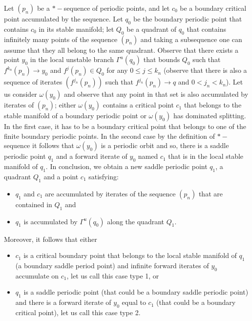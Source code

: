 \documentclass[a4paper,11pt]{article}
\theoremstyle{definition}
\def\Ga{\Gamma}
\def\Ga{\Gamma}
\begin{document}
Let $(p_n)$ be a $*-$sequence of periodic points, and let $c_0$ be a boundary critical point accumulated by the sequence. Let $q_0$ be the boundary periodic point that contains $c_0$ in its stable manifold;  let $Q_0$ be a  quadrant of $q_0$ that contains infinitely many points of the sequence $(p_n)$ and taking a subsequence one can assume that they all belong to the same quadrant.  Observe that there exists  a point $y_0$ in the local unstable branch $\Ga^u(q_0)$ that bounds $Q_0$ such that $f^{k_n}(p_n)\to y_0$ and $f^j(p_n)\in Q_0$ for any $0\leq j\leq k_n$ (observe that  there is also a sequence of iterates $(f^{j_n}(p_n))$ such that  $f^{j_n}(p_n)\to q$ and $0< j_n< k_n$).  Let us consider $\omega(y_0)$ and observe that any point in that set is also accumulated by iterates of $(p_n)$; either $\omega(y_0)$ contains a critical point $c_1$ that belongs to the stable manifold of a boundary periodic point or $\omega(y_0)$ has dominated splitting.  In the first case, it has to be a boundary critical point that belongs to one of the finite boundary periodic points. In the second case by the definition of $*-$sequence it follows that $\omega(y_0)$ is  a periodic orbit and so, there is a saddle periodic point $q_1$ and a forward  iterate of $y_0$ named $c_1$ that is in the local stable manifold of $q_1$.     In conclusion,  we obtain a new  saddle periodic point $q_1$,  a quadrant $Q_1$ and a point $c_1$ satisfying:

\begin{itemize}
    \item[--] $q_1$ and $c_1$ are  accumulated by  iterates of the sequence $(p_n)$ that are  contained in $Q_1$ and  

    \item[--] $q_1$ is accumulated  by $\Ga^u(q_0)$ along the quadrant $Q_1$.
\end{itemize}
Moreover, it follows that either 
\begin{itemize}
    \item[--] $c_1$ is a critical boundary point that belongs to the local stable manifold of $q_1$ (a boundary saddle period point)  and infinite forward iterates of $y_0$ accumulate on $c_1$, let us call this case type 1,  or 

    \item[--] $q_1$ is a   saddle periodic point (that could be a boundary saddle periodic point) and  there is a forward iterate of $y_0$ equal to  $c_1$ (that could be a boundary critical point), let us call this case type 2.
\end{itemize}
\end{document}
